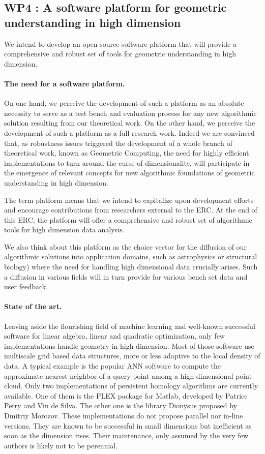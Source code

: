
\subsection*{WP4 : A software platform for geometric understanding in high
  dimension}

We intend to develop an open source  software platform that will provide a
comprehensive and robust set of tools for geometric understanding in
high
dimension. 

\paragraph{ The need for a software platform.}
On one hand, we perceive the development of such a platform as 
an absolute necessity to serve as a test bench and  evaluation process
for any new algorithmic solution resulting  from  our theoretical work.
On the other hand, we perceive the development of such a platform as
a full research work. Indeed we are convinced that, as robustness
issues triggered the development of a whole branch of theoretical
work, known as Geometric Computing, the need for
highly efficient implementations to turn around the curse of  
dimensionality,  will participate in the emergence of relevant
concepts for new algorithmic foundations
of  geometric understanding in high dimension.


The term platform means that we intend to capitalize
upon development efforts and encourage contributions
from researchers external to the ERC.
 At the end of this ERC,
the platform will offer 
a comprehensive and robust set of algorithmic tools
for high dimension data analysis.

We also think about this platform as the choice
vector for the diffusion of our algorithmic solutions 
into application domains, such as astrophysics
or structural biology) 
 where the need for handling high dimensional
data crucially arises.  Such a diffusion in various fields
 will in turn provide for various bench set data 
and user feedback.



\paragraph{ State of the art.}  
Leaving aside the flourishing field of machine learning
and well-known successful software for linear algebra,
linear and quadratic optimization,  only  few implementations handle
geometry in high dimension. 
Most of those software use multiscale  grid based
data structures,  more or less adaptive
 to the local  density of data.
A typical example is the popular ANN software to compute  the approximate
nearest-neighbor of a query point
among a  high dimensional point cloud. 
Only two implementations of persistent homology algorithms are
currently available. One of them is the PLEX package for Matlab,
developed by Patrice Perry and Vin de Silva. The other one is the
library Dionysus proposed by Dmitriy Morozov. These implementations
do not propose parallel nor in-line versions. They are known to be
successful in small dimensions but inefficient as soon as the
dimension rises.  Their  maintenance, only assumed by the very few authors
is likely not to be perennial.

